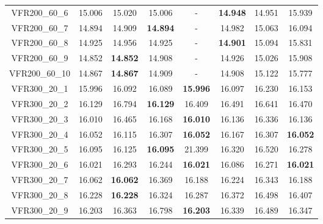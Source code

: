 \begin{tabular}{cc|ccc|ccc}
VFR200\_60\_6      & 15.006           & 15.020           & 15.006           & -                & {\bf 14.948}     & 14.951           & 15.939          \\ 
VFR200\_60\_7      & 14.894           & 14.909           & {\bf 14.894}     & -                & 14.982           & 15.063           & 16.094          \\ 
VFR200\_60\_8      & 14.925           & 14.956           & 14.925           & -                & {\bf 14.901}     & 15.094           & 15.831          \\ 
VFR200\_60\_9      & 14.852           & {\bf 14.852}     & 14.908           & -                & 14.926           & 15.026           & 15.908          \\ 
VFR200\_60\_10     & 14.867           & {\bf 14.867}     & 14.909           & -                & 14.908           & 15.122           & 15.777          \\ 
VFR300\_20\_1      & 15.996           & 16.092           & 16.089           & {\bf 15.996}     & 16.097           & 16.230           & 16.153          \\ 
VFR300\_20\_2      & 16.129           & 16.794           & {\bf 16.129}     & 16.409           & 16.491           & 16.641           & 16.470          \\ 
VFR300\_20\_3      & 16.010           & 16.465           & 16.168           & {\bf 16.010}     & 16.136           & 16.336           & 16.136          \\ 
VFR300\_20\_4      & 16.052           & 16.115           & 16.307           & {\bf 16.052}     & 16.167           & 16.307           & {\bf 16.052}    \\ 
VFR300\_20\_5      & 16.095           & 16.125           & {\bf 16.095}     & 21.399           & 16.320           & 16.520           & 16.278          \\ 
VFR300\_20\_6      & 16.021           & 16.293           & 16.244           & {\bf 16.021}     & 16.086           & 16.271           & {\bf 16.021}    \\ 
VFR300\_20\_7      & 16.062           & {\bf 16.062}     & 16.369           & 16.188           & 16.224           & 16.343           & 16.188          \\ 
VFR300\_20\_8      & 16.228           & {\bf 16.228}     & 16.324           & 16.287           & 16.372           & 16.498           & 16.407          \\ 
VFR300\_20\_9      & 16.203           & 16.363           & 16.798           & {\bf 16.203}     & 16.339           & 16.489           & 16.347          \\ 

\end{tabular}
